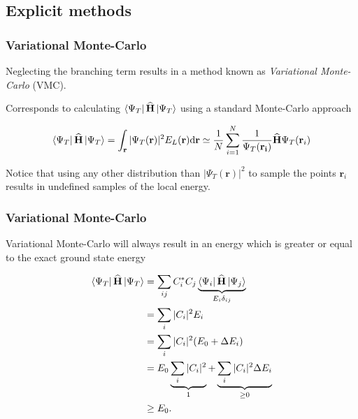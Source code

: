\subsection{Explicit methods}

\begin{frame}
 \frametitle{Variational Monte-Carlo}
 Neglecting the branching term results in a method known as \textit{Variational Monte-Carlo} (VMC).
 \shift
 
 Corresponds to calculating $\left< \Psi_T \right|{\bf\widehat{H}}\left| \Psi_T \right>$ using a standard Monte-Carlo approach
 
 \begin{equation}
  \left< \Psi_T \right|{\bf\widehat{H}}\left| \Psi_T \right> = \int_\mathbf{r} |\Psi_T(\mathbf{r})|^2 E_L(\mathbf{r})\mathrm{d}\mathbf{r} \simeq \frac{1}{N}\sum_{i=1}^N \frac{1}{\Psi_T(\mathbf{r_i})}{\bf\widehat{H}}\Psi_T(\mathbf{r}_i) 
 \end{equation}
  \shift
 
 Notice that using any other distribution than $|\Psi_T(\mathbf{r})|^2$ to sample the points $\mathbf{r}_i$ results in undefined samples of the local energy.

 
\end{frame}

\begin{frame}
 \frametitle{\textbf{Variational} Monte-Carlo}
 
 Variational Monte-Carlo will always result in an energy which is greater or equal to the exact ground state energy
 
 \begin{align*}
  \left< \Psi_T \right|{\bf\widehat{H}}\left| \Psi_T \right> &= \sum_{ij} C_i^\ast C_j \underbrace{\left< \Psi_i \right| {\bf\widehat{H}} \left| \Psi_j \right>}_{E_i\delta_{ij}} \\
                                 &= \sum_i |C_i|^2 E_i \\
                                 &= \sum_i |C_i|^2 (E_0 + \Delta E_i) \\
                                 &= E_0 \underbrace{\sum_i |C_i|^2}_{1} + \underbrace{\sum_i |C_i|^2\Delta E_i}_{\ge 0} \\
                                 &\ge E_0.
 \end{align*}
\end{frame}

